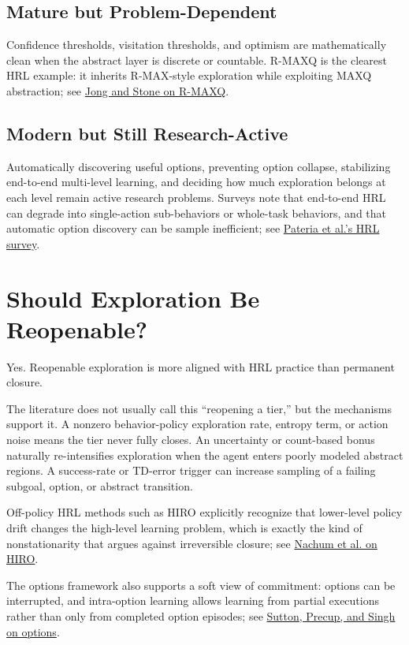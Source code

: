 \documentclass[11pt]{article}
\begin{document}
\subsection{Mature but Problem-Dependent}

Confidence thresholds, visitation thresholds, and optimism are mathematically
clean when the abstract layer is discrete or countable. R-MAXQ is the clearest
HRL example: it inherits R-MAX-style exploration while exploiting MAXQ
abstraction; see
\href{https://nn.cs.utexas.edu/?ICML08-jong=}
{Jong and Stone on R-MAXQ}.

\subsection{Modern but Still Research-Active}

Automatically discovering useful options, preventing option collapse,
stabilizing end-to-end multi-level learning, and deciding how much exploration
belongs at each level remain active research problems. Surveys note that
end-to-end HRL can degrade into single-action sub-behaviors or whole-task
behaviors, and that automatic option discovery can be sample inefficient; see
\href{https://www.mdpi.com/2504-4990/4/1/9}
{Pateria et al.'s HRL survey}.

\section{Should Exploration Be Reopenable?}

Yes. Reopenable exploration is more aligned with HRL practice than permanent
closure.

The literature does not usually call this ``reopening a tier,'' but the
mechanisms support it. A nonzero behavior-policy exploration rate, entropy
term, or action noise means the tier never fully closes. An uncertainty or
count-based bonus naturally re-intensifies exploration when the agent enters
poorly modeled abstract regions. A success-rate or TD-error trigger can
increase sampling of a failing subgoal, option, or abstract transition.

Off-policy HRL methods such as HIRO explicitly recognize that lower-level
policy drift changes the high-level learning problem, which is exactly the
kind of nonstationarity that argues against irreversible closure; see
\href{https://arxiv.org/abs/1805.08296}
{Nachum et al. on HIRO}.

The options framework also supports a soft view of commitment: options can be
interrupted, and intra-option learning allows learning from partial executions
rather than only from completed option episodes; see
\href{https://www.sciencedirect.com/science/article/pii/S0004370299000521}
{Sutton, Precup, and Singh on options}.
\end{document}

